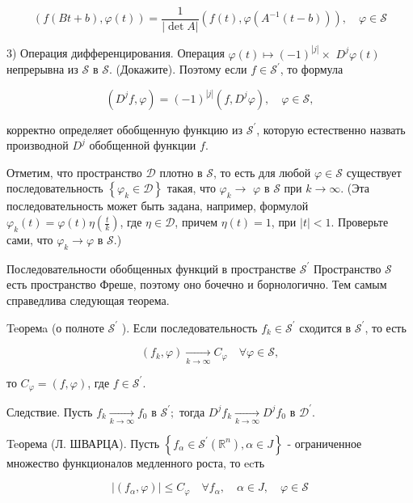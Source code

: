 $$
(f(B t+b), \varphi(t))=\frac{1}{|\operatorname{det} A|}\left(f(t), \varphi\left(A^{-1}(t-b)\right)\right), \quad \varphi \in \mathcal{S}
$$

3) Операция дифференцирования. Операция $\varphi(t) \mapsto(-1)^{|j|} \times$ $D^j \varphi(t)$ непрерывна из $\mathcal{S}$ в $\mathcal{S}$. (Докажите). Поэтому если $f \in \mathcal{S}^{\prime}$, то формула

$$
\left(D^j f, \varphi\right)=(-1)^{|j|}\left(f, D^j \varphi\right), \quad \varphi \in \mathcal{S},
$$


корректно определяет обобщенную функцию из $\mathcal{S}^{\prime}$, которую естественно назвать производной $D^j$ обобщенной функции $f$.

Отметим, что пространство $\mathcal{D}$ плотно в $\mathcal{S}$, то есть для любой $\varphi \in \mathcal{S}$ существует последовательность $\left\{\varphi_k \in \mathcal{D}\right\}$ такая, что $\varphi_k \rightarrow$ $\varphi$ в $\mathcal{S}$ при $k \rightarrow \infty$. (Эта последовательность может быть задана, например, формулой $\varphi_k(t)=\varphi(t) \eta\left(\frac{t}{k}\right)$, где $\eta \in \mathcal{D}$, причем $\eta(t)=1$, при $|t|<1$. Проверьте сами, что $\varphi_k \rightarrow \varphi$ в $\mathcal{S}$.)

Последовательности обобщенных функций в пространстве $\mathcal{S}^{\prime}$ Пространство $\mathcal{S}$ есть пространство Фреше, поэтому оно бочечно и борнологично. Тем самым справедлива следующая теорема.

Teоремa (о полноте $\mathcal{S}^{\prime}$ ). Если последовательность $f_k \in \mathcal{S}^{\prime}$ сходится в $\mathcal{S}^{\prime}$, то есть

$$
\left(f_k, \varphi\right) \underset{k \rightarrow \infty}{\longrightarrow} C_{\varphi} \quad \forall \varphi \in \mathcal{S},
$$


то $C_{\varphi}=(f, \varphi)$, где $f \in \mathcal{S}^{\prime}$.

Следствие. Пусть $f_k \underset{k \rightarrow \infty}{\longrightarrow} f_0$ в $\mathcal{S}^{\prime} ;$ тогда $D^j f_k \underset{k \rightarrow \infty}{\longrightarrow} D^j f_0$ в $\mathcal{D}^{\prime}$.

Teорема (Л. ШВАРЦА). Пусть $\left\{f_\alpha \in \mathcal{S}^{\prime}\left(\mathbb{R}^n\right), \alpha \in J\right\}$ - ограниченное множество функционалов медленного роста, то ecть

$$
\left|\left(f_\alpha, \varphi\right)\right| \leqslant C_{\varphi} \quad \forall f_\alpha, \quad \alpha \in J, \quad \varphi \in \mathcal{S}
$$


